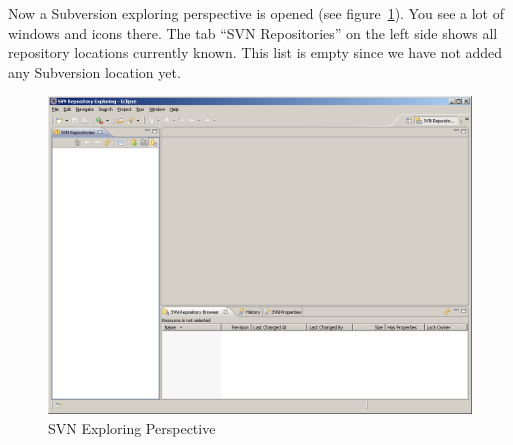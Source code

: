 Now a Subversion exploring perspective is opened (see
figure~\ref{fig:eclipse-svn-perspective}). You see a lot of windows
and icons there. The tab ``SVN Repositories'' on the left side shows
all repository locations currently known. This list is empty since we
have not added any Subversion location yet.
\begin{figure}[ht]
  \centering  \includegraphics[scale=.33]{image/eclipse/svn-exploring}
  \caption{SVN Exploring Perspective}\label{fig:eclipse-svn-perspective}
\end{figure}

